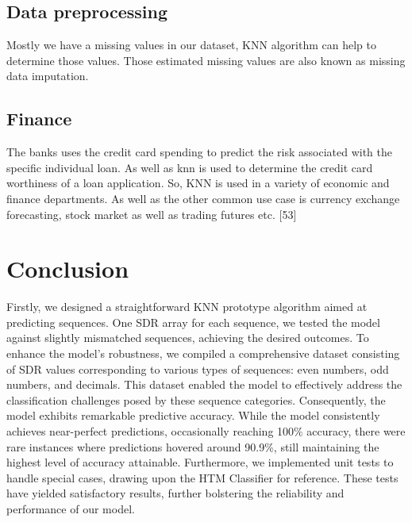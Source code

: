 \documentclass[conference]{IEEEtran}
\begin{document}
\subsection{Data preprocessing}
Mostly we have a missing values in our dataset, KNN algorithm can help to determine those values. Those estimated missing values are also known as missing data imputation. 

\subsection{Finance}
The banks uses the credit card spending to predict the risk associated with the specific individual loan. As well as knn is used to determine the credit card worthiness of a loan application. So, KNN is used in a variety of economic and finance departments. As well as the other common use case is currency exchange forecasting, stock market as well as trading futures etc.  [53]



\section{Conclusion}
Firstly, we designed a straightforward KNN prototype algorithm aimed at predicting sequences. One SDR array for each sequence, we tested the model against slightly mismatched sequences, achieving the desired outcomes. To enhance the model's robustness, we compiled a comprehensive dataset consisting of SDR values corresponding to various types of sequences: even numbers, odd numbers, and decimals. This dataset enabled the model to effectively address the classification challenges posed by these sequence categories. Consequently, the model exhibits remarkable predictive accuracy. While the model consistently achieves near-perfect predictions, occasionally reaching 100\% accuracy, there were rare instances where predictions hovered around 90.9\%, still maintaining the highest level of accuracy attainable. Furthermore, we implemented unit tests to handle special cases, drawing upon the HTM Classifier for reference. These tests have yielded satisfactory results, further bolstering the reliability and performance of our model.
\end{document}
